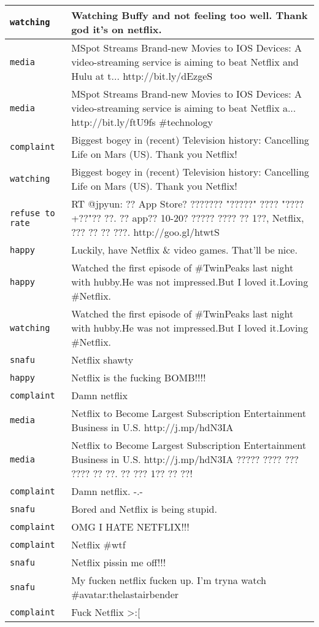 {\begin{longtable}{|l|p{160mm}|}
      \tabularnewline\hline
         \texttt{watching} & Watching Buffy and not feeling too well. Thank god it's on netflix.
      \tabularnewline\hline
         \texttt{media} & MSpot Streams Brand-new Movies to IOS Devices: A video-streaming service is aiming to beat Netflix and Hulu at t... http://bit.ly/dEzgeS
      \tabularnewline\hline
         \texttt{media} & MSpot Streams Brand-new Movies to IOS Devices: A video-streaming service is aiming to beat Netflix a... http://bit.ly/ftU9fs \#technology
      \tabularnewline\hline
         \texttt{complaint} & Biggest bogey in (recent) Television history: Cancelling Life on Mars (US). Thank you Netflix!
      \tabularnewline\hline
         \texttt{watching} & Biggest bogey in (recent) Television history: Cancelling Life on Mars (US). Thank you Netflix!
      \tabularnewline\hline
         \texttt{refuse to rate} & RT @jpyun: ?? App Store? ??????? "?????" ???? "????+??"?? ??. ?? app?? 10-20? ????? ???? ?? 1??, Netflix, ??? ?? ?? ???. http://goo.gl/htwtS
      \tabularnewline\hline
         \texttt{happy} & Luckily, have Netflix \& video games. That'll be nice.
      \tabularnewline\hline
         \texttt{happy} & Watched the first episode of \#TwinPeaks last night with hubby.He was not impressed.But I loved it.Loving \#Netflix.
      \tabularnewline\hline
         \texttt{watching} & Watched the first episode of \#TwinPeaks last night with hubby.He was not impressed.But I loved it.Loving \#Netflix.
      \tabularnewline\hline
         \texttt{snafu} & Netflix shawty
      \tabularnewline\hline
         \texttt{happy} & Netflix is the fucking BOMB!!!!
      \tabularnewline\hline
         \texttt{complaint} & Damn netflix
      \tabularnewline\hline
         \texttt{media} & Netflix to Become Largest Subscription Entertainment Business in U.S. http://j.mp/hdN3IA
      \tabularnewline\hline
         \texttt{media} & Netflix to Become Largest Subscription Entertainment Business in U.S. http://j.mp/hdN3IA ????? ???? ??? ???? ?? ??. ?? ??? 1?? ?? ??!
      \tabularnewline\hline
         \texttt{complaint} & Damn netflix. -.-
      \tabularnewline\hline
         \texttt{snafu} & Bored and Netflix is being stupid.
      \tabularnewline\hline
         \texttt{complaint} & OMG I HATE NETFLIX!!!
      \tabularnewline\hline
         \texttt{complaint} & Netflix \#wtf
      \tabularnewline\hline
         \texttt{snafu} & Netflix pissin me off!!!
      \tabularnewline\hline
         \texttt{snafu} & My fucken netflix fucken up. I'm tryna watch \#avatar:thelastairbender
      \tabularnewline\hline
         \texttt{complaint} & Fuck Netflix >:[

\end{longtable}}
